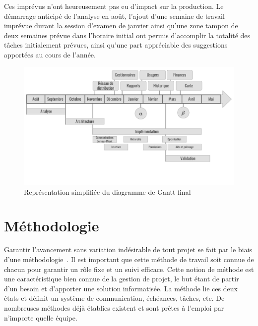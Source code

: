 \documentclass{EPL-master-thesis-covers-FR}
\begin{document}
				Ces imprévus n'ont heureusement pas eu d'impact sur la production. Le démarrage anticipé de l'analyse en août, l'ajout d'une semaine de travail imprévue durant la session d'examen de janvier ainsi qu'une zone tampon de deux semaines prévue dans l'horaire initial ont permis d'accomplir la totalité des tâches initialement prévues, ainsi qu'une part appréciable des suggestions apportées au cours de l'année.

				\begin{figure}[H]
					\includegraphics[width=\textwidth]{images/planning_timeline.png}
					\caption{Représentation simplifiée du diagramme de Gantt final}
					\label{fig:simplified_gantt}
				\end{figure}



		\section{Méthodologie}

			Garantir l'avancement sans variation indésirable de tout projet se fait par le biais d'une méthodologie~\cite{ref:kolp_methodologies}. Il est important que cette méthode de travail soit connue de chacun pour garantir un rôle fixe et un suivi efficace. Cette notion de méthode est une caractéristique bien connue de la gestion de projet, le but étant de partir d'un besoin et d'apporter une solution informatisée. La méthode lie ces deux états et définit un système de communication, échéances, tâches, etc. De nombreuses méthodes déjà établies existent et sont prêtes à l'emploi par n'importe quelle équipe.
\end{document}
